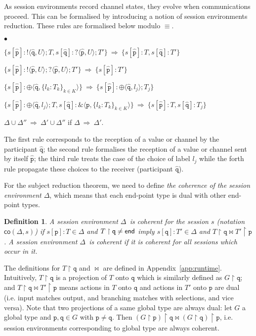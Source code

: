 \documentclass{LMCS}
\newcommand{\ptilde}[1]{{\ensuremath{#1}}}
\newcommand{\kf}[1]{\textup{\textsf{#1}}\xspace}
\newcommand{\si}[2]{\ensuremath{#1[#2]}}
\newcommand{\sii}{\si{\s}{\p}}
\newcommand{\siq}{\si{\s}{\q}}
\newcommand{\participant}[1]{\ensuremath{\mathtt{#1}}}
\newcommand{\q}{\ensuremath{\participant{q}}}
\newcommand{\p}{\ensuremath{\participant{p}}}
\newcommand{\s}{\ensuremath{s}}
\newcommand{\at}[1]{\ensuremath{\ptilde{#1}}}
\newcommand{\set}[1]{\ensuremath{\{#1\}}}
\newcommand{\G}{\ensuremath{G}}
\newcommand{\U}{\ensuremath{U}}
\newcommand{\pro}[2]{\ensuremath{#1\upharpoonright#2}}
\newcommand{\D}{\ensuremath{\Delta}}
\newcommand{\T}{\ensuremath{T}}
\newcommand{\End}{\kf{end}}
\newcommand{\branchtype}{\ensuremath{\&\langle\p,\{l_k:\T_k\}_{k\in K}\rangle}}
\newcommand{\coe}[2]{\ensuremath{\mathsf{co}({#1},{#2})}}
\newcommand{\dual}[2]{\ensuremath{{#1}\bowtie{#2}}}
\newcommand{\sered}[2]{\ensuremath{{#1}~\Rightarrow~{#2}}}
\newcommand{\Lout}[3]{\ensuremath{!\langle #1,#2\rangle;#3}}
\newcommand{\Lin}[3]{\ensuremath{?\langle #1,#2\rangle;#3}}
\newcommand{\Lsel}[2]{\ensuremath{\oplus\langle#1,\{l_k:#2\}_{k\in
K}\rangle}}
\newcommand{\LselSingle}[2]{\ensuremath{\oplus\langle{#1,#2}\rangle}}
\newcommand{\pv}{\ensuremath{\at{\hat{\p}}}}
\newcommand{\qv}{\ensuremath{\at{\hat{\q}}}}
\newtheorem{DEFINITION}[DUM]{Definition}{}{}
\begin{document}
\noindent
As session environments record channel states, they evolve when communications proceed.
This can be formalised by introducing
a notion of session environments reduction. These rules are formalised below
modulo $\equiv$. 
{\small
\begin{iteMize}{$\bullet$}
\item
$\sered{\set{\si{\s}{\pv}:\Lout{\qv}{\U}{\T},\si{\s}{\qv}:\Lin{\pv}{\U}{\T'}}}{\!\set{\si\s\pv: \T, \si\s{\qv}:\T'}}$
\item
$\sered{\set{\si{\s}{\pv}:\Lout{\pv}{\U}{\Lin{\pv}{\U}{\T'}}}}
{\!\set{\si\s\pv: \T'}}$
\item
$\sered{\set{\si\s\pv:\Lsel{\qv}{\T_k}}}{\set{\si\s\pv:\LselSingle{\qv}{l_j};T_j}}$
\item
$\sered{\set{\si\s\pv:\LselSingle{\qv}{l_j};T,
\si\s{\qv}:\branchtype}}{\set{\si\s\pv:\T, \si\s{\qv}:\T_j}}$
\item
$\sered{\D\cup\D''}{\D'\cup\D''}$ if $\sered{\D}{\D'}$. 
\end{iteMize}
}
\noindent
The first rule corresponds to the reception of
a value or channel by the participant $\qv$; 
the second rule formalises 
the reception of a value or channel sent by itself $\pv$;
the third rule 
treats the case of the choice of label $l_j$ while the forth rule
propagate these choices to the receiver (participant $\qv$). 

For the subject reduction theorem, we need to define 
{\em the coherence of the session 
environment \D}, which means that each end-point type is dual with
other end-point types.  

\begin{DEFINITION}\label{cd}
A session environment \D\ is {\em coherent for the session \s}
(notation \coe{\D}{\s}) if $ \sii:\T\in\Delta$ and
$\pro{\T}\q\not=\End$ imply $ \siq:\T'\in\Delta$ and
$\dual{\pro{\T}\q}{\pro{\T'}\p}$.  A session environment \D\ is
{\em coherent} if it is coherent for all sessions 
which occur in it.
\end{DEFINITION}
The definitions for $\pro{\T}\q$ and $\dual{}{}$ are defined in
Appendix~\ref{app:runtime}. Intuitively, $\pro{\T}\q$ is a projection
of $T$ onto $\q$ which is similarly defined as $\pro{\G}\q$; and 
$\dual{\pro{\T}\q}{\pro{\T'}\p}$ means actions in $\T$ onto 
$\q$ and actions in $\T'$ onto $\p$ are dual (i.e. input matches 
output, and branching matches with selections, and vice versa). 
Note that two projections of a same global type are always dual: 
let $\G$ a global type and $\p,\q \in \G$
with $\p \neq \q$. Then
$\dual{\pro{(\pro{\G}{\p})}{\q}}{\pro{(\pro{\G}{\q})}{\p}}$, 
i.e. session environments corresponding to global
type are always coherent.
\end{document}
